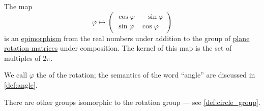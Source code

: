 \begin{proposition}\label{thm:plane_rotation_matrix_angle}
  The map
  \begin{equation}\label{eq:thm:plane_rotation_matrix_angle}
    \varphi
    \mapsto
    \begin{pmatrix}
      \cos \varphi & -\sin \varphi \\
      \sin \varphi & \cos \varphi
    \end{pmatrix}
  \end{equation}
  is an \hyperref[def:morphism_cancellation/right]{epimorphism} from the real numbers under addition to the group of \hyperref[thm:plane_rotation_matrix]{plane rotation matrices} under composition. The kernel of this map is the set of multiples of \( 2\pi \).

  We call \( \varphi \) the  of the rotation; the semantics of the word \enquote{angle} are discussed in \cref{def:angle}.

  There are other groups isomorphic to the rotation group --- see \cref{def:circle_group}.
\end{proposition}
